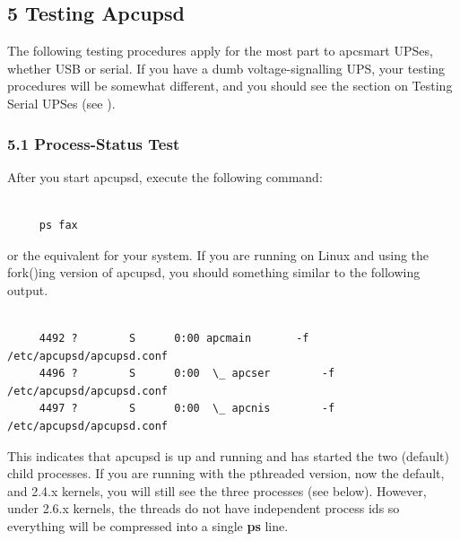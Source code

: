 {\label{Testing-Apcupsd}

\subsection*{5 Testing Apcupsd}

\label{index-Testing-84}
The following testing procedures apply for the most part to apcsmart UPSes,
whether USB or serial.  If you have a dumb voltage-signalling UPS, your
testing procedures will be somewhat different, and you should see the section
on Testing Serial UPSes (see 
). 

\label{Process_002dStatus-Test}

\subsubsection*{5.1 Process-Status Test}

\label{index-Process-Status-Testing-85}
\label{index-Testing_002c-Process-Status-86}
After you start apcupsd, execute the following command: 

\footnotesize
\begin{verbatim}
     
     ps fax
\end{verbatim}
\normalsize

or the equivalent for your system. If you are running on Linux and using the
fork()ing version of apcupsd, you should something similar to the following
output. 

\footnotesize
\begin{verbatim}
     
     4492 ?        S      0:00 apcmain       -f /etc/apcupsd/apcupsd.conf
     4496 ?        S      0:00  \_ apcser        -f /etc/apcupsd/apcupsd.conf
     4497 ?        S      0:00  \_ apcnis        -f /etc/apcupsd/apcupsd.conf
\end{verbatim}
\normalsize

This indicates that apcupsd is up and running and has started the two
(default) child processes. If you are running with the pthreaded version, now
the default, and 2.4.x kernels, you will still see the three processes (see
below).  However, under 2.6.x kernels, the threads do not have independent
process ids so everything will be compressed into a single {\bf ps} line.  

}

